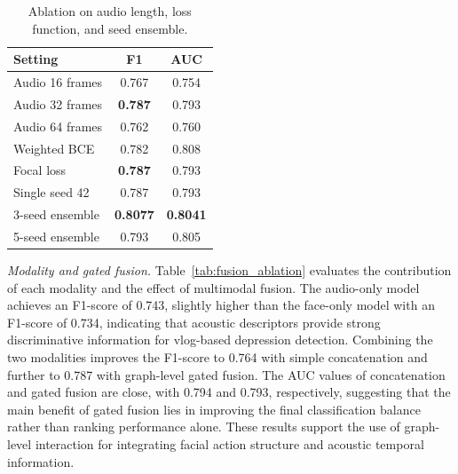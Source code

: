 \documentclass[conference]{IEEEtran}
\begin{document}
\begin{table}[htb]
\centering
\caption{Ablation on modalities and fusion.}
\label{tab:fusion_ablation}
\footnotesize
{}
\end{table}

\begin{table}[t]
\centering
\caption{Ablation on audio length, loss function, and seed ensemble.}
\label{tab:design_ablation}
\small
\begin{tabular}{lcc}
\toprule[1.2pt]
Setting & F1 & AUC \\
\midrule[0.8pt]
Audio 16 frames & 0.767 & 0.754 \\
Audio 32 frames & \textbf{0.787} & 0.793 \\
Audio 64 frames & 0.762 & 0.760 \\
\midrule[0.8pt]
Weighted BCE & 0.782 & 0.808 \\
Focal loss & \textbf{0.787} & 0.793 \\
\midrule[0.8pt]
Single seed 42 & 0.787 & 0.793 \\
3-seed ensemble & \textbf{0.8077} & \textbf{0.8041} \\
5-seed ensemble & 0.793 & 0.805 \\
\bottomrule[1.2pt]
\end{tabular}
\end{table}

\textit{Modality and gated fusion.}
Table~\ref{tab:fusion_ablation} evaluates the contribution of each modality and the effect of multimodal fusion. The audio-only model achieves an F1-score of 0.743, slightly higher than the face-only model with an F1-score of 0.734, indicating that acoustic descriptors provide strong discriminative information for vlog-based depression detection. Combining the two modalities improves the F1-score to 0.764 with simple concatenation and further to 0.787 with graph-level gated fusion. The AUC values of concatenation and gated fusion are close, with 0.794 and 0.793, respectively, suggesting that the main benefit of gated fusion lies in improving the final classification balance rather than ranking performance alone. These results support the use of graph-level interaction for integrating facial action structure and acoustic temporal information.
\end{document}
